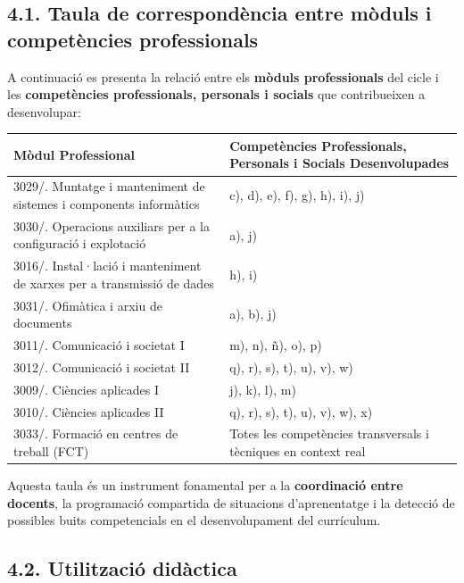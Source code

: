 \documentclass[
  paper=a4,
  ,captions=tableheading
]{scrartcl}
\renewenvironment{quote}{\begin{customblockquote}\list{}{\rightmargin=0em\leftmargin=0em}%
\item\relax\color{blockquote-text}\ignorespaces}{\unskip\unskip\endlist\end{customblockquote}}
\begin{document}
\hypertarget{taula-de-corresponduxe8ncia-entre-muxf2duls-i-competuxe8ncies-professionals}{%
\subsection{4.1. Taula de correspondència entre mòduls i competències
professionals}\label{taula-de-corresponduxe8ncia-entre-muxf2duls-i-competuxe8ncies-professionals}}

A continuació es presenta la relació entre els \textbf{mòduls
professionals} del cicle i les \textbf{competències professionals,
personals i socials} que contribueixen a desenvolupar:

\begin{longtable}[]{@{}ll@{}}
\toprule
\textbf{Mòdul Professional} & \textbf{Competències Professionals,
Personals i Socials Desenvolupades} \\
\midrule
\endhead
3029/. Muntatge i manteniment de sistemes i components informàtics & c),
d), e), f), g), h), i), j) \\
3030/. Operacions auxiliars per a la configuració i explotació & a),
j) \\
3016/. Instal·lació i manteniment de xarxes per a transmissió de dades &
h), i) \\
3031/. Ofimàtica i arxiu de documents & a), b), j) \\
3011/. Comunicació i societat I & m), n), ñ), o), p) \\
3012/. Comunicació i societat II & q), r), s), t), u), v), w) \\
3009/. Ciències aplicades I & j), k), l), m) \\
3010/. Ciències aplicades II & q), r), s), t), u), v), w), x) \\
3033/. Formació en centres de treball (FCT) & Totes les competències
transversals i tècniques en context real \\
\bottomrule
\end{longtable}

\begin{quote}
Aquesta taula és un instrument fonamental per a la \textbf{coordinació
entre docents}, la programació compartida de situacions d'aprenentatge i
la detecció de possibles buits competencials en el desenvolupament del
currículum.
\end{quote}

\hypertarget{utilitzaciuxf3-diduxe0ctica}{%
\subsection{4.2. Utilització
didàctica}\label{utilitzaciuxf3-diduxe0ctica}}
\end{document}
